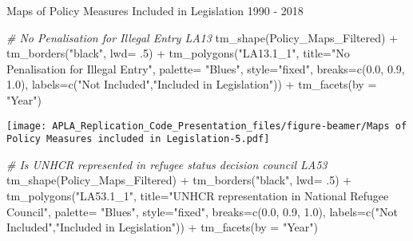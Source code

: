\documentclass[
  ignorenonframetext,
]{beamer}
\newenvironment{Shaded}{\begin{snugshade}}{\end{snugshade}}
\newcommand{\AttributeTok}[1]{\textcolor[rgb]{0.77,0.63,0.00}{#1}}
\newcommand{\CommentTok}[1]{\textcolor[rgb]{0.56,0.35,0.01}{\textit{#1}}}
\newcommand{\DecValTok}[1]{\textcolor[rgb]{0.00,0.00,0.81}{#1}}
\newcommand{\FloatTok}[1]{\textcolor[rgb]{0.00,0.00,0.81}{#1}}
\newcommand{\FunctionTok}[1]{\textcolor[rgb]{0.00,0.00,0.00}{#1}}
\newcommand{\NormalTok}[1]{#1}
\newcommand{\SpecialCharTok}[1]{\textcolor[rgb]{0.00,0.00,0.00}{#1}}
\newcommand{\StringTok}[1]{\textcolor[rgb]{0.31,0.60,0.02}{#1}}
\begin{document}
\begin{frame}[fragile]{Maps of Policy Measures Included in Legislation
1990 - 2018}
\begin{Shaded}
\begin{Highlighting}[]
\CommentTok{\# No Penalisation for Illegal Entry LA13}
\FunctionTok{tm\_shape}\NormalTok{(Policy\_Maps\_Filtered) }\SpecialCharTok{+} \FunctionTok{tm\_borders}\NormalTok{(}\StringTok{"black"}\NormalTok{, }\AttributeTok{lwd=}\NormalTok{ .}\DecValTok{5}\NormalTok{) }\SpecialCharTok{+} \FunctionTok{tm\_polygons}\NormalTok{(}\StringTok{"LA13.1\_1"}\NormalTok{, }\AttributeTok{title=}\StringTok{"No Penalisation for Illegal Entry"}\NormalTok{, }\AttributeTok{palette=} \StringTok{"Blues"}\NormalTok{, }\AttributeTok{style=}\StringTok{"fixed"}\NormalTok{, }\AttributeTok{breaks=}\FunctionTok{c}\NormalTok{(}\FloatTok{0.0}\NormalTok{, }\FloatTok{0.9}\NormalTok{, }\FloatTok{1.0}\NormalTok{), }\AttributeTok{labels=}\FunctionTok{c}\NormalTok{(}\StringTok{"Not Included"}\NormalTok{,}\StringTok{"Included in Legislation"}\NormalTok{)) }\SpecialCharTok{+} \FunctionTok{tm\_facets}\NormalTok{(}\AttributeTok{by =} \StringTok{"Year"}\NormalTok{)}
\end{Highlighting}
\end{Shaded}

\texttt{[image: APLA\_Replication\_Code\_Presentation\_files/figure-beamer/Maps of Policy Measures included in Legislation-5.pdf]}

\begin{Shaded}
\begin{Highlighting}[]
\CommentTok{\# Is UNHCR represented in refugee status decision council LA53}
\FunctionTok{tm\_shape}\NormalTok{(Policy\_Maps\_Filtered) }\SpecialCharTok{+} \FunctionTok{tm\_borders}\NormalTok{(}\StringTok{"black"}\NormalTok{, }\AttributeTok{lwd=}\NormalTok{ .}\DecValTok{5}\NormalTok{) }\SpecialCharTok{+} \FunctionTok{tm\_polygons}\NormalTok{(}\StringTok{"LA53.1\_1"}\NormalTok{, }\AttributeTok{title=}\StringTok{"UNHCR representation in National Refugee Council"}\NormalTok{, }\AttributeTok{palette=} \StringTok{"Blues"}\NormalTok{, }\AttributeTok{style=}\StringTok{"fixed"}\NormalTok{, }\AttributeTok{breaks=}\FunctionTok{c}\NormalTok{(}\FloatTok{0.0}\NormalTok{, }\FloatTok{0.9}\NormalTok{, }\FloatTok{1.0}\NormalTok{), }\AttributeTok{labels=}\FunctionTok{c}\NormalTok{(}\StringTok{"Not Included"}\NormalTok{,}\StringTok{"Included in Legislation"}\NormalTok{)) }\SpecialCharTok{+} \FunctionTok{tm\_facets}\NormalTok{(}\AttributeTok{by =} \StringTok{"Year"}\NormalTok{)}
\end{Highlighting}
\end{Shaded}


\end{frame}
\end{document}
